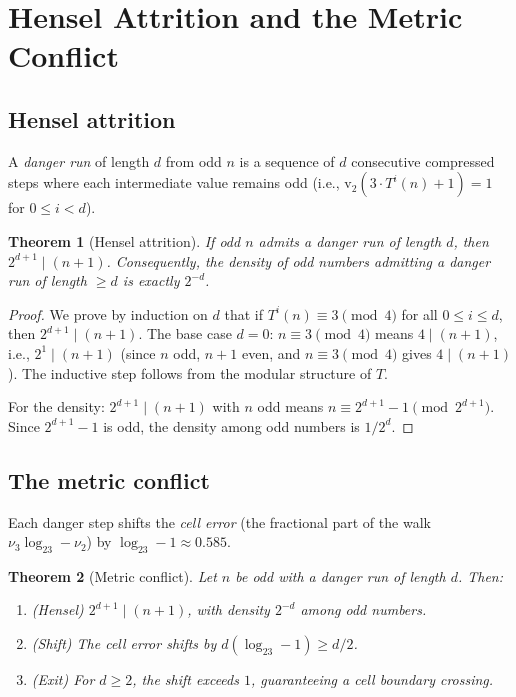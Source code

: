 \documentclass{CUP-JNL-FMP}%
\newtheorem{theorem}{Theorem}[section]
\theoremstyle{definition}
\numberwithin{equation}{section}
\newcommand{\val}{\mathrm{v}_2}
\newcommand{\logb}{\log_2}
\begin{document}
\section{Hensel Attrition and the Metric Conflict}\label{sec:hensel}

\subsection{Hensel attrition}

A \emph{danger run} of length $d$ from odd $n$ is a sequence of $d$ consecutive
compressed steps where each intermediate value remains odd (i.e.,
$\val(3 \cdot T^i(n) + 1) = 1$ for $0 \leq i < d$).

\begin{theorem}[Hensel attrition]\label{thm:hensel}
  If odd $n$ admits a danger run of length $d$, then $2^{d+1} \mid (n+1)$.
  Consequently, the density of odd numbers admitting a danger run of length
  $\geq d$ is exactly $2^{-d}$.
\end{theorem}

\begin{proof}
  We prove by induction on $d$ that if $T^i(n) \equiv 3 \pmod{4}$ for all
  $0 \leq i \leq d$, then $2^{d+1} \mid (n+1)$. The base case $d = 0$:
  $n \equiv 3 \pmod{4}$ means $4 \mid (n+1)$, i.e., $2^1 \mid (n+1)$
  (since $n$ odd, $n+1$ even, and $n \equiv 3 \pmod 4$ gives $4 \mid (n+1)$).
  The inductive step follows from the modular structure of $T$.

  For the density: $2^{d+1} \mid (n+1)$ with $n$ odd means
  $n \equiv 2^{d+1} - 1 \pmod{2^{d+1}}$. Since $2^{d+1} - 1$ is odd,
  the density among odd numbers is $1/2^d$.
\end{proof}

\subsection{The metric conflict}

Each danger step shifts the \emph{cell error} (the fractional part of the
walk $\nu_3 \logb 3 - \nu_2$) by $\logb 3 - 1 \approx 0.585$.

\begin{theorem}[Metric conflict]\label{thm:metric}
  Let $n$ be odd with a danger run of length $d$. Then:
  \begin{enumerate}
    \item[(i)] \textup{(Hensel)} $2^{d+1} \mid (n+1)$, with density $2^{-d}$
      among odd numbers.
    \item[(ii)] \textup{(Shift)} The cell error shifts by
      $d(\logb 3 - 1) \geq d/2$.
    \item[(iii)] \textup{(Exit)} For $d \geq 2$, the shift exceeds $1$,
      guaranteeing a cell boundary crossing.
  \end{enumerate}
\end{theorem}
\end{document}
